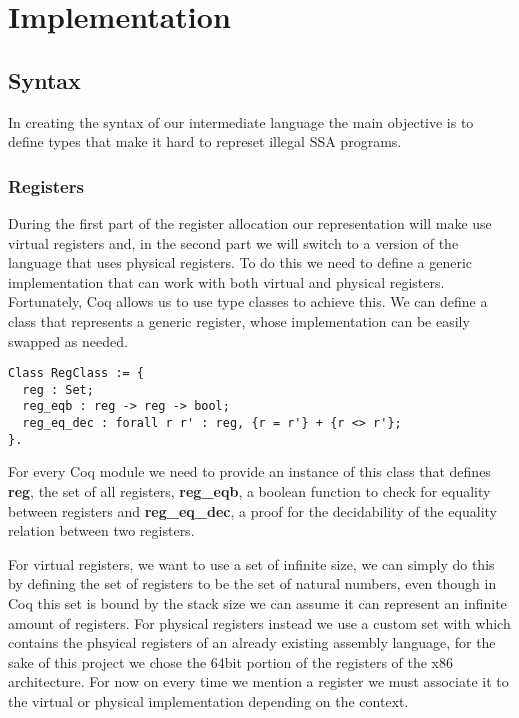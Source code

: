 \chapter{Implementation}
\label{cha:implementation}

\section{Syntax}
In creating the syntax of our intermediate language the main objective is to define types that make it hard to represet illegal SSA programs.

\subsection{Registers}
During the first part of the register allocation our representation will make use virtual registers and, in the second part we will switch to a version of the language that uses physical registers. To do this we need to define a generic implementation that can work with both virtual and physical registers.
Fortunately, Coq allows us to use type classes to achieve this. We can define a class that represents a generic register, whose implementation can be easily swapped as needed.

\begin{lstlisting}[language=Coq]
Class RegClass := {
  reg : Set;
  reg_eqb : reg -> reg -> bool;
  reg_eq_dec : forall r r' : reg, {r = r'} + {r <> r'};
}.
\end{lstlisting}

For every Coq module we need to provide an instance of this class that defines \textbf{reg}, the set of all registers, \textbf{reg\_eqb}, a boolean function to check for equality between registers and \textbf{reg\_eq\_dec}, a proof for the decidability of the equality relation between two registers.

For virtual registers, we want to use a set of infinite size, we can simply do this by defining the set of registers to be the set of natural numbers, even though in Coq this set is bound by the stack size we can assume it can represent an infinite amount of registers.
For physical registers instead we use a custom set with which contains the phsyical registers of an already existing assembly language, for the sake of this project we chose the 64bit portion of the registers of the x86 architecture.
For now on every time we mention a register we must associate it to the virtual or physical implementation depending on the context.

